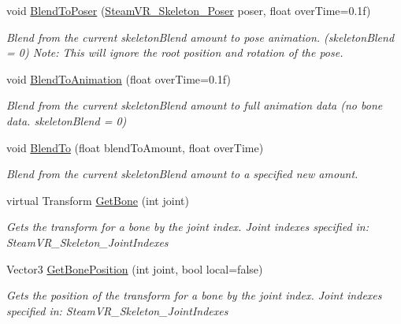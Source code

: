 \begin{DoxyCompactItemize}
void \mbox{\hyperlink{class_valve_1_1_v_r_1_1_steam_v_r___behaviour___skeleton_a7cad4650f70ac4fe81acdf6800a33392}{Blend\+To\+Poser}} (\mbox{\hyperlink{class_valve_1_1_v_r_1_1_steam_v_r___skeleton___poser}{Steam\+V\+R\+\_\+\+Skeleton\+\_\+\+Poser}} poser, float over\+Time=0.\+1f)
\begin{DoxyCompactList}\small\item\em Blend from the current skeleton\+Blend amount to pose animation. (skeleton\+Blend = 0) Note\+: This will ignore the root position and rotation of the pose. \end{DoxyCompactList}\item 
void \mbox{\hyperlink{class_valve_1_1_v_r_1_1_steam_v_r___behaviour___skeleton_a441a05ea1040c75c0bf3ee3a62062833}{Blend\+To\+Animation}} (float over\+Time=0.\+1f)
\begin{DoxyCompactList}\small\item\em Blend from the current skeleton\+Blend amount to full animation data (no bone data. skeleton\+Blend = 0) \end{DoxyCompactList}\item 
void \mbox{\hyperlink{class_valve_1_1_v_r_1_1_steam_v_r___behaviour___skeleton_abb429a927ec527cef6c9f637eaa725e8}{Blend\+To}} (float blend\+To\+Amount, float over\+Time)
\begin{DoxyCompactList}\small\item\em Blend from the current skeleton\+Blend amount to a specified new amount. \end{DoxyCompactList}\item 
virtual Transform \mbox{\hyperlink{class_valve_1_1_v_r_1_1_steam_v_r___behaviour___skeleton_a0d79a785e44f82950ea9d3cfa61d05b5}{Get\+Bone}} (int joint)
\begin{DoxyCompactList}\small\item\em Gets the transform for a bone by the joint index. Joint indexes specified in\+: Steam\+V\+R\+\_\+\+Skeleton\+\_\+\+Joint\+Indexes \end{DoxyCompactList}\item 
Vector3 \mbox{\hyperlink{class_valve_1_1_v_r_1_1_steam_v_r___behaviour___skeleton_ac94d3f838396d2d5e8db90a620621011}{Get\+Bone\+Position}} (int joint, bool local=false)
\begin{DoxyCompactList}\small\item\em Gets the position of the transform for a bone by the joint index. Joint indexes specified in\+: Steam\+V\+R\+\_\+\+Skeleton\+\_\+\+Joint\+Indexes \end{DoxyCompactList}\item 

\end{DoxyCompactItemize}
